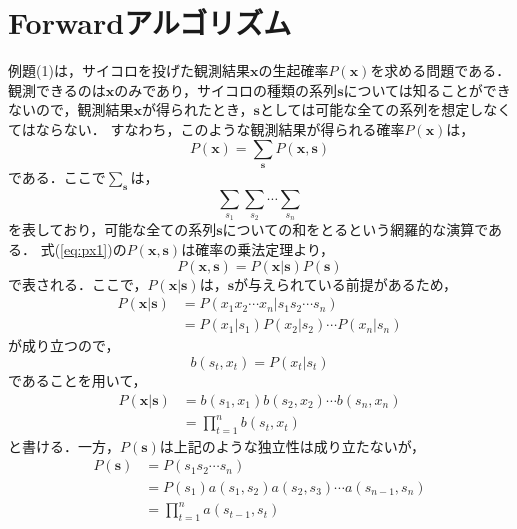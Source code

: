 \documentclass[a4j]{jarticle}
\begin{document}
\section{Forwardアルゴリズム}
例題(1)は，サイコロを投げた観測結果$\mathbf{x}$の生起確率$P(\mathbf{x})$を求める問題である．
観測できるのは$\mathbf{x}$のみであり，サイコロの種類の系列$\mathbf{s}$については知ることができないので，観測結果$\mathbf{x}$が得られたとき，$\mathbf{s}$としては可能な全ての系列を想定しなくてはならない．
すなわち，このような観測結果が得られる確率$P(\mathbf{x})$は，
\begin{equation}
P(\mathbf{x}) = \sum_{\mathbf{s}} P(\mathbf{x}, \mathbf{s}) \label{eq:px1}
\end{equation}
である．ここで$\displaystyle \sum_{\mathbf{s}}$は，
\begin{equation}
  \sum_{s_{1}}\sum_{s_{2}} \cdots \sum_{s_{n}}
\end{equation}
を表しており，可能な全ての系列$\mathbf{s}$についての和をとるという網羅的な演算である．
式(\ref{eq:px1})の$P(\mathbf{x}, \mathbf{s})$は確率の乗法定理より，
\begin{equation}
P(\mathbf{x}, \mathbf{s}) = P(\mathbf{x} | \mathbf{s}) P(\mathbf{s}) \label{eq:p_x_s_jyouhou}
\end{equation}
で表される．ここで，$P(\mathbf{x} | \mathbf{s}) $は，$\mathbf{s}$が与えられている前提があるため，
\begin{align}
P(\mathbf{x} | \mathbf{s}) & = P(x_{1} x_{2} \cdots x_{n} | s_{1} s_{2} \cdots s_{n}) \\
& = P(x_{1} | s_{1}) P(x_{2} | s_{2}) \cdots P(x_{n} | s_{n})
\end{align}
が成り立つので，
\begin{equation}
b(s_{t}, x_{t}) = P(x_{t} | s_{t})
\end{equation}
であることを用いて，
\begin{align}
P(\mathbf{x} | \mathbf{s}) & = b(s_{1}, x_{1}) b(s_{2}, x_{2}) \cdots b(s_{n}, x_{n}) \\
& = \prod_{t=1}^{n} b(s_{t}, x_{t}) \label{eq:p_x_g_s}
\end{align}
と書ける．一方，$ P(\mathbf{s})$は上記のような独立性は成り立たないが，
\begin{align}
P(\mathbf{s}) & = P(s_{1} s_{2} \cdots s_{n}) \\
& = P(s_{1}) a(s_{1}, s_{2}) a(s_{2}, s_{3}) \cdots a(s_{n-1}, s_{n}) \\
& = \prod_{t=1}^{n} a(s_{t-1}, s_{t}) \label{eq:p_s}
\end{align}
\end{document}
